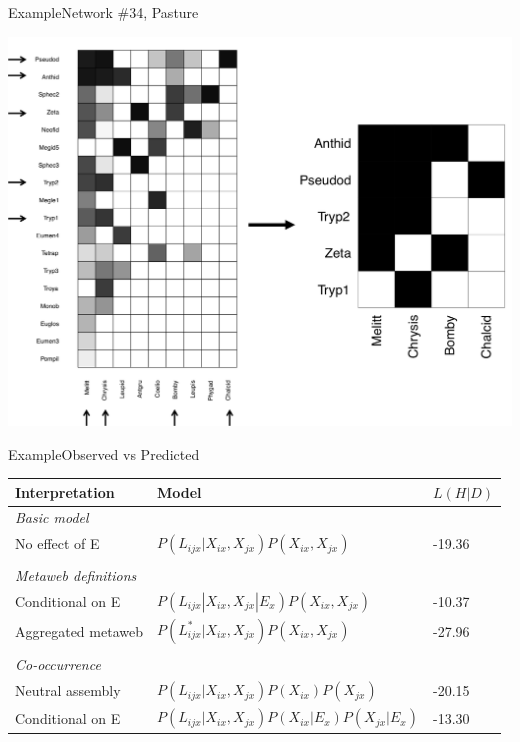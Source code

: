 \documentclass{eecslides}
\begin{document}

	\begin{frame}{Example}{Network \#34, Pasture}
		\begin{center}
			\includegraphics[height=0.75\textheight]{example}\\
		\end{center}
	\end{frame}


	\begin{frame}{Example}{Observed vs Predicted}
		\begin{tabular}{lll}
			\hline
			\textbf{Interpretation} & \textbf{Model} & \textbf{$L(H|D)$}\\
			\hline
			\textit{Basic model} & &\\
			No effect of E & $P(L_{ijx}|X_{ix},X_{jx})P(X_{ix},X_{jx})$ & -19.36\\
			\\
			\textit{Metaweb definitions} & & \\
			Conditional on E & $P(L_{ijx}|X_{ix},X_{jx}|E_x)P(X_{ix},X_{jx})$ & -10.37\\
			Aggregated metaweb & $P(L^*_{ijx}|X_{ix},X_{jx})P(X_{ix},X_{jx})$ & -27.96\\
			\\
			\textit{Co-occurrence} & &\\
			Neutral assembly & $P(L_{ijx}|X_{ix},X_{jx})P(X_{ix})P(X_{jx})$ &  -20.15\\
			Conditional on E& $P(L_{ijx}|X_{ix},X_{jx})P(X_{ix}|E_x)P(X_{jx}|E_x)$ & -13.30\\
			\hline
		\end{tabular}
	\end{frame}
\end{document}
